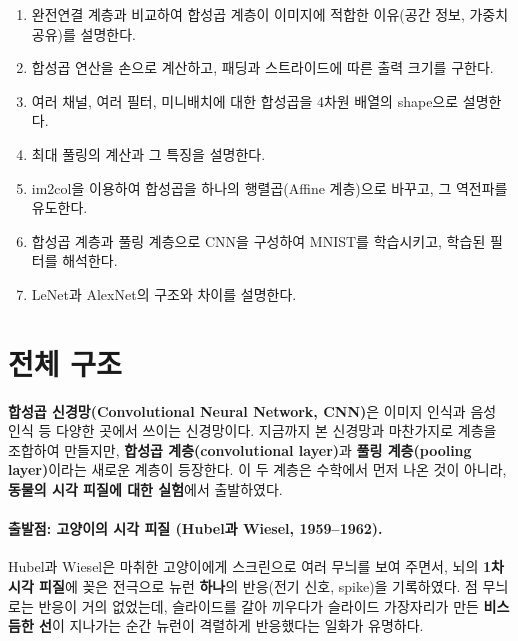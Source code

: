 \documentclass[11pt,a4paper]{article}
\begin{document}
\begin{enumerate}[label=\arabic*.]
\item 완전연결 계층과 비교하여 합성곱 계층이 이미지에 적합한 이유(공간 정보, 가중치 공유)를 설명한다.
\item 합성곱 연산을 손으로 계산하고, 패딩과 스트라이드에 따른 출력 크기를 구한다.
\item 여러 채널, 여러 필터, 미니배치에 대한 합성곱을 4차원 배열의 shape으로 설명한다.
\item 최대 풀링의 계산과 그 특징을 설명한다.
\item im2col을 이용하여 합성곱을 하나의 행렬곱(Affine 계층)으로 바꾸고, 그 역전파를 유도한다.
\item 합성곱 계층과 풀링 계층으로 CNN을 구성하여 MNIST를 학습시키고, 학습된 필터를 해석한다.
\item LeNet과 AlexNet의 구조와 차이를 설명한다.
\end{enumerate}

\section{전체 구조}\label{sec:structure}

\textbf{합성곱 신경망(Convolutional Neural Network, CNN)}은 이미지 인식과 음성 인식 등 다양한 곳에서 쓰이는 신경망이다.
지금까지 본 신경망과 마찬가지로 계층을 조합하여 만들지만,
\textbf{합성곱 계층(convolutional layer)}과 \textbf{풀링 계층(pooling layer)}이라는 새로운 계층이 등장한다.
이 두 계층은 수학에서 먼저 나온 것이 아니라, \textbf{동물의 시각 피질에 대한 실험}에서 출발하였다.

\paragraph{출발점: 고양이의 시각 피질 (Hubel과 Wiesel, 1959--1962).}
Hubel과 Wiesel은 마취한 고양이에게 스크린으로 여러 무늬를 보여 주면서,
뇌의 \textbf{1차 시각 피질}에 꽂은 전극으로 뉴런 \textbf{하나}의 반응(전기 신호, spike)을 기록하였다.
점 무늬로는 반응이 거의 없었는데, 슬라이드를 갈아 끼우다가 슬라이드 가장자리가 만든
\textbf{비스듬한 선}이 지나가는 순간 뉴런이 격렬하게 반응했다는 일화가 유명하다.
\end{document}
